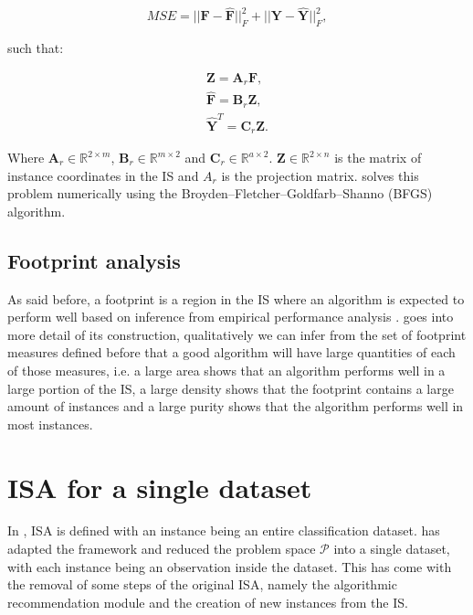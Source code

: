 \begin{equation}
	MSE = ||\mathbf{F} - \mathbf{\hat{F}}||_F^2 + ||\mathbf{Y} - \mathbf{\hat{Y}}||_F^2,
\end{equation}

such that:

\begin{gather}
	\mathbf{Z} = \mathbf{A}_r \mathbf{F} \label{eq:z_is}, \\
	\mathbf{\hat{F}} = \mathbf{B}_r \mathbf{Z} \label{eq:f_hat}, \\
	\mathbf{\hat{Y}}^T = \mathbf{C}_r \mathbf{Z} \label{eq:y_hat}.
\end{gather}

Where $\mathbf{A}_r \in \mathbb{R}^{2 \times m}$, $\mathbf{B}_r \in \mathbb{R}^{m \times 2}$ and $\mathbf{C}_r \in \mathbb{R}^{a \times 2}$. $\mathbf{Z} \in \mathbb{R}^{2 \times n}$ is the matrix of instance coordinates in the IS and $A_r$ is the projection matrix. \cite{Lorena2022} solves this problem numerically using the Broyden–Fletcher–Goldfarb–Shanno (BFGS) algorithm.

\subsection{Footprint analysis}

As said before, a footprint is a region in the IS where an algorithm is expected to perform well based on inference from empirical performance analysis \cite{Munoz2018}. \cite{Lorena2022} goes into more detail of its construction, qualitatively we can infer from the set of footprint measures defined before that a good algorithm will have large quantities of each of those measures, i.e. a large area shows that an algorithm performs well in a large portion of the IS, a large density shows that the footprint contains a large amount of instances and a large purity shows that the algorithm performs well in most instances.

\section{ISA for a single dataset}

In \cite{Munoz2018}, ISA is defined with an instance being an entire classification dataset. \cite{Lorena2022} has adapted the framework and reduced the problem space $\mathcal{P}$ into a single dataset, with each instance being an observation inside the dataset. This has come with the removal of some steps of the original ISA, namely the algorithmic recommendation module and the creation of new instances from the IS.

